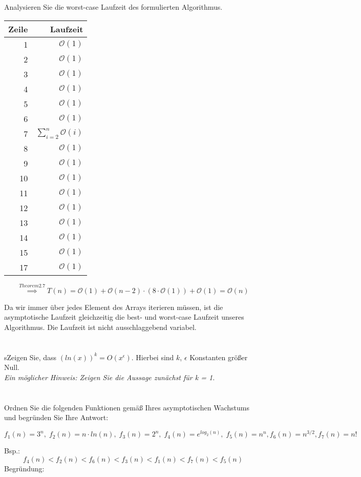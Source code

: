 \documentclass[12pt]{article}
\theoremstyle{remark}
\begin{document}
\subsection{} Analysieren Sie die worst-case Laufzeit des formulierten Algorithmus.

\begin{tabular}{r|r}
Zeile & Laufzeit \\ \hline
1  & $\mathcal{O}(1)$ \\
2  & $\mathcal{O}(1)$ \\
3  & $\mathcal{O}(1)$ \\
4  & $\mathcal{O}(1)$ \\
5  & $\mathcal{O}(1)$ \\
6  & $\mathcal{O}(1)$ \\
7  & $\sum_{i=2}^{n} \mathcal{O}(i)$ \\
8  & $\mathcal{O}(1)$ \\
9  & $\mathcal{O}(1)$ \\
10 & $\mathcal{O}(1)$ \\
11 & $\mathcal{O}(1)$ \\
12 & $\mathcal{O}(1)$ \\
13 & $\mathcal{O}(1)$ \\
14 & $\mathcal{O}(1)$ \\
15 & $\mathcal{O}(1)$ \\
17 & $\mathcal{O}(1)$ \\
\end{tabular}

\[
\stackrel{Theorem 2.7}{\implies} T(n) = \mathcal{O}(1) + \mathcal{O}(n-2) \cdot (8 \cdot \mathcal{O}(1))+ \mathcal{O}(1) = \mathcal{O}(n)
\]

Da wir immer über jedes Element des Arrays iterieren müssen, ist die asymptotische Laufzeit gleichzeitig die best- und worst-case Laufzeit unseres Algorithmus. Die Laufzeit ist nicht ausschlaggebend variabel.

\newpage
\section{}

sZeigen Sie, dass $(ln(x))^k = O(x^\epsilon).$ Hierbei sind $k$, $\epsilon$ Konstanten größer Null. \\ {\it Ein möglicher Hinweis: Zeigen Sie die Aussage zunächst für k = 1.}

\section{}

Ordnen Sie die folgenden Funktionen gemäß Ihres asymptotischen Wachstums und begründen Sie Ihre Antwort:

\[
f_1(n) = 3^n, \; f_2(n) = n \cdot ln(n), \; f_3(n) = 2^n, \; f_4(n) = e^{log_2(n)}, \; f_5(n) = n^n, f_6(n) = n^{3/2}, f_7(n) = n!
\]

Bsp.: \\
\[
f_4(n) < f_2(n) < f_6(n) < f_3(n) < f_1(n) < f_7(n) < f_5(n)
\]
Begründung: \\
\end{document}

